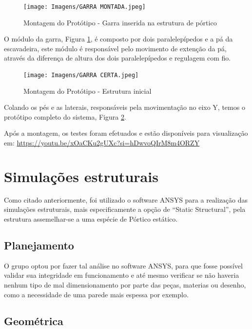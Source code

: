 \documentclass[deposito, acronym, symbols]{fei}
\begin{document}
   \begin{figure}[!htb]
 \centering
    \caption{Montagem do Protótipo - Garra inserida na estrutura de pórtico}
    \texttt{[image: Imagens/GARRA MONTADA.jpeg]}
    \label{fig: 2D_3_2}
 \end{figure}

O módulo da garra, Figura \ref{fig: 2D_3_2}, é composto por dois paralelepípedos e a pá da escavadeira, este módulo é responsável pelo movimento de extenção da pá, através da diferença de altura dos dois paralelepípedos e regulagem com fio.

  \begin{figure}[!htb]
 \centering
    \caption{Montagem do Protótipo - Estrutura inicial}
    \texttt{[image: Imagens/GARRA CERTA.jpeg]}
    \label{fig: 2D_6_2}
 \end{figure}

Colando os pés e as laterais, responsáveis pela movimentação no eixo Y, temos o protótipo completo do sistema, Figura \ref{fig: 2D_6_2}.

Após a montagem, os testes foram efetuados e estão disponíveis para visualização em: \url{https://youtu.be/xOaCKu2gUXc?si=hDwvoQIrM8m4ORZY}

\chapter{Simulações estruturais}
 
Como  citado anteriormente, foi utilizado o software ANSYS para a realização das simulações estruturais, mais especificamente a opção de “Static Structural”, pela estrutura assemelhar-se a uma espécie de Pórtico estático.

\section{Planejamento}

O grupo optou por fazer tal análise no software ANSYS, para que fosse possível validar sua integridade em funcionamento e até mesmo verificar se não haveria nenhum tipo de mal dimensionamento por parte das peças, materias ou desenho, como a necessidade de uma parede mais espessa por exemplo. 

\section{Geométrica}
\end{document}
